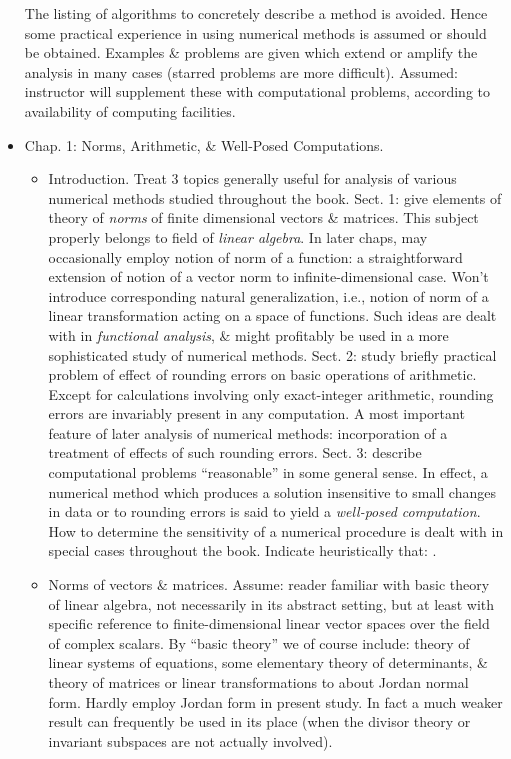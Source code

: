 \documentclass{article}
\begin{document}
\begin{itemize}
	The listing of algorithms to concretely describe a method is avoided. Hence some practical experience in using numerical methods is assumed or should be obtained. Examples \& problems are given which extend or amplify the analysis in many cases (starred problems are more difficult). Assumed: instructor will supplement these with computational problems, according to availability of computing facilities.	
	
	\item {\sf Chap. 1: Norms, Arithmetic, \& Well-Posed Computations.}
	\begin{itemize}
		\item {\sf Introduction.} Treat 3 topics generally useful for analysis of various numerical methods studied throughout the book. Sect. 1: give elements of theory of {\it norms} of finite dimensional vectors \& matrices. This subject properly belongs to field of {\it linear algebra}. In later chaps, may occasionally employ notion of norm of a function: a straightforward extension of notion of a vector norm to infinite-dimensional case. Won't introduce corresponding natural generalization, i.e., notion of norm of a linear transformation acting on a space of functions. Such ideas are dealt with in {\it functional analysis}, \& might profitably be used in a more sophisticated study of numerical methods. Sect. 2: study briefly practical problem of effect of rounding errors on basic operations of arithmetic. Except for calculations involving only exact-integer arithmetic, rounding errors are invariably present in any computation. A most important feature of later analysis of numerical methods: incorporation of a treatment of effects of such rounding errors. Sect. 3: describe computational problems ``reasonable'' in some general sense. In effect, a numerical method which produces a solution insensitive to small changes in data or to rounding errors is said to yield a {\it well-posed computation}. How to determine the sensitivity of a numerical procedure is dealt with in special cases throughout the book. Indicate heuristically that: .
		\item {\sf Norms of vectors \& matrices.} Assume: reader familiar with basic theory of linear algebra, not necessarily in its abstract setting, but at least with specific reference to finite-dimensional linear vector spaces over the field of complex scalars. By ``basic theory'' we of course include: theory of linear systems of equations, some elementary theory of determinants, \& theory of matrices or linear transformations to about Jordan normal form. Hardly employ Jordan form in present study. In fact a much weaker result can frequently be used in its place (when the divisor theory or invariant subspaces are not actually involved). 
		

\end{itemize}
\end{itemize}
\end{document}

